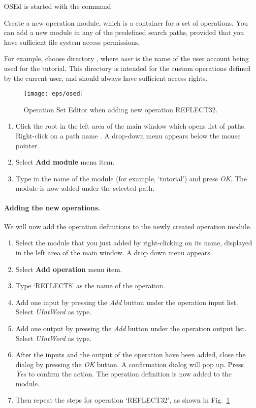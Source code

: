 \documentclass[twoside]{tceusermanual}
\begin{document}
OSEd is started with the command


Create a new operation module, which is a container for a set of operations.
You can add a new module in any of the predefined search paths, provided
that you have sufficient file system access permissions.

For example, choose directory
, where \emph{user} is the
name of the user account being used for the tutorial.  This directory
is intended for the custom operations defined by the current user, and
should always have sufficient access rights.

\begin{figure}
  \begin{center} \texttt{[image: eps/osed]}
  \caption{Operation Set Editor when adding new operation REFLECT32.} 
  \label{fig:osed} \end{center}
\end{figure}


\begin{enumerate}
\item%
  Click the root in the left area of the main window which opens list
  of paths. Right-click on a path name
  . A drop-down menu appears
  below the mouse pointer.
\item%
  Select \textbf{Add module} menu item. 
\item%
  Type in the name of the module (for example, `tutorial') and press \emph{OK}.
  The module is now added under the selected path.
\end{enumerate} 

\paragraph{Adding the new operations.} We will now add the operation
definitions to the newly created operation module.

\begin{enumerate}
\item%
  Select the module that you just added by right-clicking on its name,
  displayed in the left area of the main window. A drop down menu appears.
\item%
  Select \textbf{Add operation} menu item.
\item%
  Type `REFLECT8' as the name of the operation.
\item%
  Add one input by pressing the \emph{Add} button under the operation input
  list. Select \textit{UIntWord} as type.
\item%
  Add one output by pressing the \emph{Add} button under the operation output
  list. Select \textit{UIntWord} as type.
\item%
  After the inputs and the output of the operation have been added, close
  the dialog by pressing the \emph{OK} button. A confirmation dialog will pop
  up. Press \emph{Yes} to confirm the action. The operation definition is
  now added to the module.
\item%
  Then repeat the steps for operation `REFLECT32', as shown in Fig.~\ref{fig:osed}
\end{enumerate}
\end{document}
